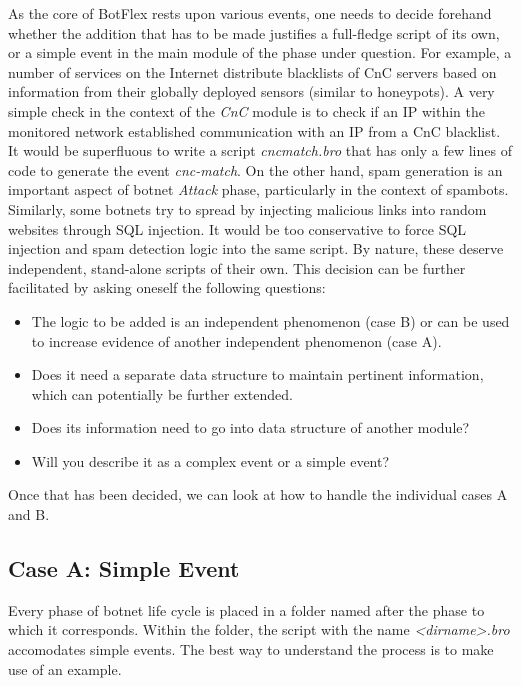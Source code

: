 \documentclass[acmtocl]{acmtrans2m}
\begin{document}
As the core of BotFlex rests upon various events, 
one needs to decide forehand whether the addition
that has to be made justifies a full-fledge script
of its own, or a simple event in the main module of 
the phase under question. For example, a number of
services on the Internet distribute blacklists of
CnC servers based on information from their
globally deployed sensors (similar to honeypots). 
A very simple check in the context of the \textit{CnC}
module is to check if an IP within the monitored network
established communication with an IP from a CnC blacklist.
It would be superfluous to write a script \textit{cnc\textunderscore match.bro}
that has only a few lines of code to generate the event 
\textit{cnc-match}. On the other hand, spam generation is an 
important aspect of botnet \textit{Attack} phase, particularly 
in the context of spambots. Similarly, some botnets 
\cite{botnet-asprox}
 try to spread by injecting malicious links 
into random websites through SQL injection. It would be too
conservative to force SQL injection and spam detection
logic into the same script. By nature, these deserve
independent, stand-alone scripts of their own. This 
decision can be further facilitated by asking oneself 
the following questions: 
\begin{itemize}
\item The logic to be added is an independent phenomenon (case B)
or can be used to increase evidence of another independent 
phenomenon (case A).
\item Does it need a separate data structure to maintain
pertinent information, which can potentially be further extended.
\item Does its information need to go into data structure of another 
module?
\item Will you describe it as a complex event or a simple event? 
\end{itemize} 

Once that has been decided, we can look at how to handle 
the individual cases A and B.

\subsection{Case A: Simple Event}
Every phase of botnet life cycle is placed in a folder
named after the phase to which it corresponds. Within the
folder, the script with the name \textit{<dir\textunderscore name>.bro} 
accomodates simple events. The best way to understand the
process is to make use of an example.
\end{document}
